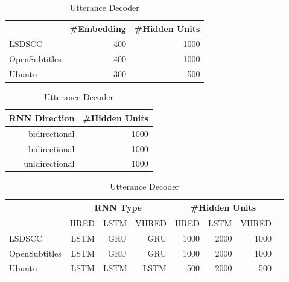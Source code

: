 \begin{table}[htb]
    \centering
    \caption{Model Configurations}
    \label{tab:model_config}
    \begin{subtable}{0.5\textwidth}
        \centering
        \caption{Utterance Encoder}
        \begin{tabular}{|l|r|r|}
            \hline
            & {\#Embedding} & {\#Hidden Units} \\
            \hline
            LSDSCC & 400 & 1000 \\
            \hline
            OpenSubtitles & 400 & 1000 \\
            \hline
            Ubuntu & 300 & 500 \\
            \hline
        \end{tabular}
    \end{subtable}%
    \begin{subtable}{0.45\textwidth}
        \centering
        \caption{Context Encoder}
        \begin{tabular}{|r|r|}
            \hline
            RNN Direction & \#Hidden Units \\
            \hline
            bidirectional & 1000 \\
            \hline
            bidirectional & 1000 \\
            \hline
            unidirectional & 1000 \\
            \hline
        \end{tabular}
    \end{subtable}
    \begin{subtable}{\textwidth}
        \centering
        \caption{Utterance Decoder}
        \begin{tabular}{|l|*{7}{r|}}
            \hline
            & \multicolumn{3}{c|}{RNN Type}
            & \multicolumn{3}{c|}{\#Hidden Units} \\
            \hline
            & HRED & LSTM & VHRED & HRED & LSTM & VHRED \\
            \hline
            LSDSCC & LSTM & GRU & GRU & 1000 & 2000 & 1000 \\
            \hline
            OpenSubtitles & LSTM & GRU & GRU & 1000 & 2000 & 1000 \\
            \hline
            Ubuntu & LSTM & LSTM & LSTM & 500 & 2000 & 500 \\
            \hline
        \end{tabular}
    \end{subtable}
\end{table}